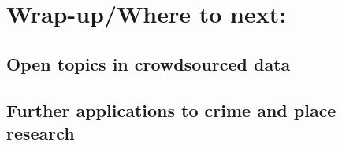 \documentclass[
]{article}
\begin{document}
\hypertarget{wrap-upwhere-to-next}{%
\section{Wrap-up/Where to next:}\label{wrap-upwhere-to-next}}

\hypertarget{open-topics-in-crowdsourced-data}{%
\subsection{Open topics in crowdsourced
data}\label{open-topics-in-crowdsourced-data}}

\hypertarget{further-applications-to-crime-and-place-research}{%
\subsection{Further applications to crime and place
research}\label{further-applications-to-crime-and-place-research}}
\end{document}
